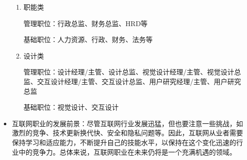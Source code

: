 \documentclass{article}
\begin{document}
\begin{itemize}
\begin{enumerate}
\item 职能类\par
管理职位：行政总监、财务总监、HRD等\par
基础职位：人力资源、行政、财务、法务等\par

\item 设计类\par
管理职位：设计经理/主管、设计总监、视觉设计经理/主管、视觉设计总监、交互设计经理/主管、交互设计总监、用户研究经理/主管、用户研究总监\par
基础职位：视觉设计、交互设计\par
\end{enumerate}
\item 互联网职业的发展前景：尽管互联网行业发展迅猛，但也要注意一些挑战，如激烈的竞争、技术更新换代快、安全和隐私问题等。因此，互联网从业者需要保持学习和适应能力，不断提升自己的技能水平，以保持在这个变化迅速的行业中的竞争力。总体来说，互联网职业在未来仍将是一个充满机遇的领域。

\end{itemize}
\end{document}
